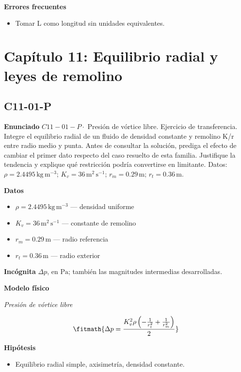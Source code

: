 \documentclass[10pt,openany]{book}
\begin{document}
\noindent\textbf{Errores frecuentes}
\begin{itemize}
\item Tomar L como longitud sin unidades equivalentes.
\end{itemize}
\section{Capítulo 11: Equilibrio radial y leyes de remolino}
\subsection*{C11-01-P}

\noindent\textbf{Enunciado}
\(C11-01-P \cdot\) Presión de vórtice libre. Ejercicio de transferencia. Integre el equilibrio radial de un fluido de densidad constante y remolino K/r entre radio medio y punta. Antes de consultar la solución, prediga el efecto de cambiar el primer dato respecto del caso resuelto de esta familia. Justifique la tendencia y explique qué restricción podría convertirse en limitante. Datos: \(\rho=2.4495\, \mathrm{kg}\,\mathrm{m}^{-3}\); \(K_v=36\, \mathrm{m}^{2}\,\mathrm{s}^{-1}\); \(r_m=0.29\, \mathrm{m}\); \(r_t=0.36\, \mathrm{m}\).

\noindent\textbf{Datos}
\begin{itemize}
\item $\rho = 2.4495\,\mathrm{kg}\,\mathrm{m}^{-3}$ — densidad uniforme
\item $K_v = 36\,\mathrm{m}^{2}\,\mathrm{s}^{-1}$ — constante de remolino
\item $r_m = 0.29\,\mathrm{m}$ — radio referencia
\item $r_t = 0.36\,\mathrm{m}$ — radio exterior
\end{itemize}

\noindent\textbf{Incógnita}
$\Delta p$, en $\mathrm{Pa}$; también las magnitudes intermedias desarrolladas.

\noindent\textbf{Modelo físico}

\noindent\textit{Presión de vórtice libre}

\[
\fitmath{\Delta p=\frac{K_v^{2} \rho \left(- \frac{1}{r_t^{2}} + \frac{1}{r_m^{2}}\right)}{2}}
\]

\noindent\textbf{Hipótesis}
\begin{itemize}
\item Equilibrio radial simple, axisimetría, densidad constante.
\end{itemize}
\end{document}
